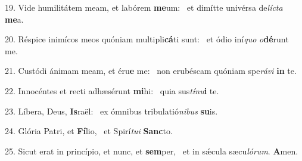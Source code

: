 19. Vide humilitátem meam, et labórem \textbf{me}um: \ast\  et dimítte univérsa de\textit{líc}\textit{ta} \textbf{me}a.\

20. Réspice inimícos meos quóniam multipli\textbf{cá}ti sunt: \ast\  et ódio iní\textit{quo} \textit{o}\textbf{dé}runt me.\

21. Custódi ánimam meam, et éru\textbf{e} me: \ast\  non erubéscam quóniam spe\textit{rá}\textit{vi} \textbf{in} te.\

22. Innocéntes et recti adhæsérunt \textbf{mi}hi: \ast\  quia sus\textit{tí}\textit{nu}\textbf{i} te.\

23. Líbera, Deus, \textbf{Is}raël: \ast\  ex ómnibus tribulatió\textit{ni}\textit{bus} \textbf{su}is.\

24. Glória Patri, et \textbf{Fí}lio, \ast\  et Spirí\textit{tu}\textit{i} \textbf{Sanc}to.\

25. Sicut erat in princípio, et nunc, et \textbf{sem}per, \ast\  et in sǽcula sæcu\textit{ló}\textit{rum}. \textbf{A}men.\

